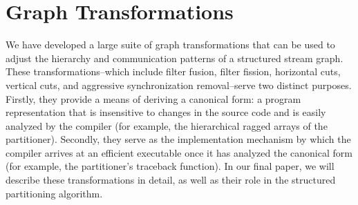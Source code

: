 \section{Graph Transformations}
\label{sec:transforms}

We have developed a large suite of graph transformations that can be
used to adjust the hierarchy and communication patterns of a
structured stream graph.  These transformations--which include filter
fusion, filter fission, horizontal cuts, vertical cuts, and aggressive
synchronization removal--serve two distinct purposes.  Firstly, they
provide a means of deriving a canonical form: a program representation
that is insensitive to changes in the source code and is easily
analyzed by the compiler (for example, the hierarchical ragged arrays
of the partitioner).  Secondly, they serve as the implementation
mechanism by which the compiler arrives at an efficient executable
once it has analyzed the canonical form (for example, the
partitioner's traceback function).  In our final paper, we will
describe these transformations in detail, as well as their role in the
structured partitioning algorithm.
